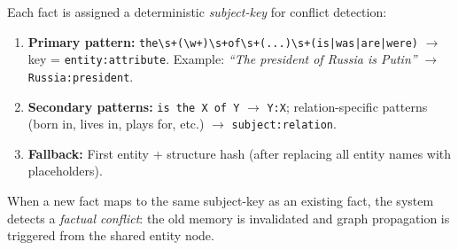 \documentclass[11pt]{article}
\begin{document}
Each fact is assigned a deterministic \textit{subject-key} for conflict detection:

\begin{enumerate}
\item \textbf{Primary pattern:} \texttt{the\textbackslash s+(\textbackslash w+)\textbackslash s+of\textbackslash s+(...)\textbackslash s+(is|was|are|were)} $\rightarrow$ key = \texttt{entity:attribute}. Example: \textit{``The president of Russia is Putin''} $\rightarrow$ \texttt{Russia:president}.
\item \textbf{Secondary patterns:} \texttt{is the X of Y} $\rightarrow$ \texttt{Y:X}; relation-specific patterns (born in, lives in, plays for, etc.) $\rightarrow$ \texttt{subject:relation}.
\item \textbf{Fallback:} First entity + structure hash (after replacing all entity names with placeholders).
\end{enumerate}

\noindent When a new fact maps to the same subject-key as an existing fact, the system detects a \textit{factual conflict}: the old memory is invalidated and graph propagation is triggered from the shared entity node.



\end{document}
